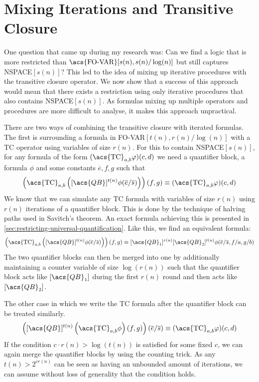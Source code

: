 \section{Mixing Iterations and Transitive Closure}\label{sec:mixing-iterations-and-transitive-closure}

\sloppy One question that came up during my research was: Can we find a logic that is more restricted than $\text{\acs{FO-VAR}}[s(n), s(n)/\log(n)]$ but still captures \acs{NSPACE}$[s(n)]$?
This led to the idea of mixing up iterative procedures with the transitive closure operator.
We now show that a success of this approach would mean that there exists a restriction using only iterative procedures that also contains \acs{NSPACE}$[s(n)]$.
As formulas mixing up multiple operators and procedures are more difficult to analyse, it makes this approach unpractical.

There are two ways of combining the transitive closure with iterated formulas.
The first is surrounding a formula in \acs{FO-VAR}$[t(n), r(n)/\log(n)]$ with a \acs{TC} operator using variables of size $r(n)$.
For this to contain \acs{NSPACE}$[s(n)]$, for any formula of the form $(\text{\acs{TC}}_{a, b}\varphi)(c, d)$ we need a quantifier block, a formula $\phi$ and some constants $\overline{e}, f, g$ such that
\[
    \left(\text{\acs{TC}}_{a, b}\left([\acs{QB}]^{t(n)}\phi(\overline{e}/\overline{s})\right)\right)(f, g) \equiv (\text{\acs{TC}}_{a, b}\varphi)(c, d)
\]
We know that we can simulate any \acs{TC} formula with variables of size $r(n)$ using $r(n)$ iterations of a quantifier block.
This is done by the technique of halving paths used in Savitch's theorem.
An exact formula achieving this is presented in \cref{sec:restricting-universal-quantification}.
Like this, we find an equivalent formula:
\[
    \left(\text{\acs{TC}}_{a, b}\left([\acs{QB}]^{t(n)}\phi(\overline{e}/\overline{s})\right)\right)(f, g) \equiv [\acs{QB}_1]^{r(n)}[\acs{QB}_2]^{t(n)}\phi(\overline{e}/\overline{s}, f/a, g/b)
\]
The two quantifier blocks can then be merged into one by additionally maintaining a counter variable of size $\log(r(n))$ such that the quantifier block acts like $[\acs{QB}_1]$ during the first $r(n)$ round and then acts like $[\acs{QB}_2]$.

The other case in which we write the \acs{TC} formula after the quantifier block can be treated similarly.
\[
    \left([\acs{QB}]^{t(n)}\left(\text{\acs{TC}}_{a, b}\phi\right)(f, g)\right)(\overline{e}/\overline{s}) \equiv (\text{\acs{TC}}_{a, b}\varphi)(c, d)
\]
If the condition $c \cdot r(n) > \log(t(n))$ is satisfied for some fixed $c$, we can again merge the quantifier blocks by using the counting trick.
As any $t(n) > 2^{cr(n)}$ can be seen as having an unbounded amount of iterations, we can assume without loss of generality that the condition holds.

